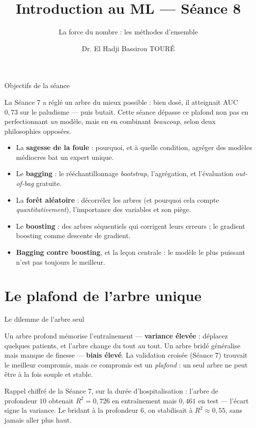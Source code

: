 \documentclass[aspectratio=169,11pt]{beamer}
\title{Introduction au ML — Séance 8}
\subtitle{La force du nombre : les méthodes d'ensemble}
\author{Dr. El Hadji Bassirou TOURÉ}
\institute{Département de Mathématiques et Informatique\\ Faculté des Sciences et Techniques\\ Université Cheikh Anta Diop de Dakar}
\date{}
\begin{document}
\begin{frame}\titlepage\end{frame}

\begin{frame}{Objectifs de la séance}
\begin{ucaddef}[Contenu]
{\small La Séance 7 a réglé un arbre du mieux possible : bien dosé, il atteignait AUC $0{,}73$ sur le paludisme — puis butait. Cette séance dépasse ce plafond non pas en perfectionnant \emph{un} modèle, mais en en combinant \emph{beaucoup}, selon deux philosophies opposées.}
\end{ucaddef}
\begin{itemize}\small
  \item La \textbf{sagesse de la foule} : pourquoi, et à quelle condition, agréger des modèles médiocres bat un expert unique.
  \item Le \textbf{bagging} : le rééchantillonnage \emph{bootstrap}, l'agrégation, et l'évaluation \emph{out-of-bag} gratuite.
  \item La \textbf{forêt aléatoire} : décorréler les arbres (et pourquoi cela compte \emph{quantitativement}), l'importance des variables et son piège.
  \item Le \textbf{boosting} : des arbres séquentiels qui corrigent leurs erreurs ; le gradient boosting comme descente de gradient.
  \item \textbf{Bagging contre boosting}, et la leçon centrale : le modèle le plus puissant n'est pas toujours le meilleur.
\end{itemize}
\end{frame}

\section{Le plafond de l'arbre unique}

\begin{frame}{Le dilemme de l'arbre seul}
\begin{ucadfront}
{\small Un arbre profond mémorise l'entraînement — \textbf{variance élevée} : déplacez quelques patients, et l'arbre change du tout au tout. Un arbre bridé généralise mais manque de finesse — \textbf{biais élevé}. La validation croisée (Séance 7) trouvait le meilleur compromis, mais ce compromis est un \emph{plafond} : un seul arbre ne peut être à la fois souple et stable.}
\end{ucadfront}
{\small Rappel chiffré de la Séance 7, sur la durée d'hospitalisation : l'arbre de profondeur $10$ obtenait $R^2 = 0{,}726$ en entraînement mais $0{,}461$ en test — l'écart signe la variance. Le bridant à la profondeur $6$, on stabilisait à $R^2 \approx 0{,}55$, sans jamais aller plus haut.}
\end{frame}
\end{document}
